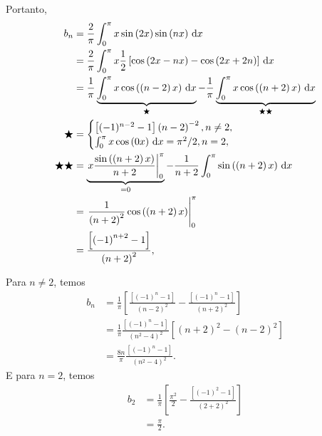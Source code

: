 \documentclass[a4paper,12pt, leqno, answers]{exam}
\begin{document}
\begin{questions}
\begin{solution}
        Portanto,
        \begin{align*}
            b_n &= \frac{2}{\pi} \int_0^\pi x \sin\left( 2 x \right) \sin\left( n x \right) \, \mathrm{d}x \\
            &= \frac{2}{\pi} \int_0^\pi x \frac{1}{2} \left[ \cos\left( 2 x - n x \right) - \cos\left( 2 x + 2 n \right) \right] \, \mathrm{d}x \\
            &= \frac{1}{\pi} \underbrace{\int_0^\pi x \cos\left( \left( n - 2 \right) x \right) \, \mathrm{d}x}_{\bigstar} - \frac{1}{\pi} \underbrace{\int_0^\pi x \cos\left( \left( n + 2 \right) x \right) \, \mathrm{d}x}_{\bigstar\bigstar} \\
            \bigstar &= \begin{cases}
                \left[ (-1)^{n - 2} - 1 \right] \left( n - 2 \right)^{-2}, n \neq 2, \\
                \int_0^\pi x \cos\left( 0 x \right) \, \mathrm{d}x = \pi^2 / 2, n = 2,
            \end{cases} \\
            \bigstar\bigstar &= \underbrace{\left. x \frac{\sin\left( \left( n + 2 \right) x \right)}{n + 2} \right|_0^\pi}_{=0} - \frac{1}{n + 2} \int_0^\pi \sin\left( \left( n + 2 \right) x \right) \, \mathrm{d}x \\
            &= \left. \frac{1}{\left( n + 2 \right)^2} \cos\left( \left( n + 2 \right) x \right) \right|_0^\pi \\
            &= \frac{\left[ \left( -1 \right)^{n + 2} - 1 \right]}{\left( n + 2 \right)^2},
        \end{align*}

        Para $n \neq 2$, temos
        \begin{align*}
            b_n &= \frac{1}{\pi} \left[ \frac{\left[ (-1)^n - 1 \right]}{\left( n - 2 \right)^2} - \frac{\left[ \left( -1 \right)^n - 1 \right]}{\left( n + 2 \right)^2} \right] \\
            &= \frac{1}{\pi} \frac{\left[ \left( -1 \right)^n - 1 \right]}{\left( n^2 - 4 \right)^2} \left[ \left( n + 2 \right)^2 - \left( n - 2 \right)^2 \right] \\
            &= \frac{8 n}{\pi} \frac{\left[ \left( -1 \right)^n - 1 \right]}{\left( n^2 - 4 \right)^2}.
        \end{align*}
        E para $n = 2$, temos
        \begin{align*}
            b_2 &= \frac{1}{\pi} \left[ \frac{\pi^2}{2} - \frac{\left[ \left( -1 \right)^2 - 1 \right]}{\left( 2 + 2 \right)^2} \right] \\
            &= \frac{\pi}{2}.
        \end{align*}


\end{solution}
\end{questions}
\end{document}

